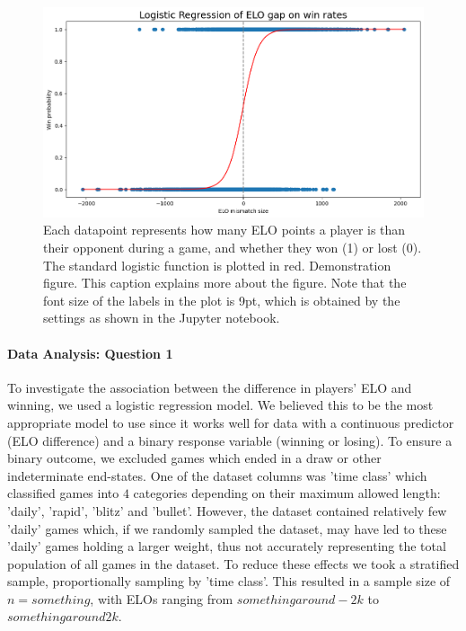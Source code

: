 \documentclass[10pt,a4paper,twocolumn]{article}
\begin{document}
\begin{figure}[t]
  \centering
  \includegraphics{report/images/log_regression.png}
  \caption{Each datapoint represents how many ELO points a player is than their opponent during a game, and whether they won (1) or lost (0). The standard logistic function is plotted in red.
  Demonstration figure. This caption explains more about the figure. Note that the font size of the labels in the plot is 9pt, which is obtained by the settings as shown in the Jupyter notebook.}
  \label{fds-project-template:fig:log_regression}
\end{figure}


\paragraph{Data Analysis: Question 1}
To investigate the association between the difference in players' ELO and winning, we used a logistic regression model. We believed this to be the most appropriate model to use since it works well for data with a continuous predictor (ELO difference) and a binary response variable (winning or losing). To ensure a binary outcome, we excluded games which ended in a draw or other indeterminate end-states.
One of the dataset columns was 'time class' which classified games into $4$ categories depending on their maximum allowed length: 'daily', 'rapid', 'blitz' and 'bullet'. However, the dataset contained relatively few 'daily' games which, if we randomly sampled the dataset, may have led to these 'daily' games holding a larger weight, thus not accurately representing the total population of all games in the dataset.
To reduce these effects we took a stratified sample, proportionally sampling by 'time class'. This resulted in a sample size of $n={something}$, with ELOs ranging from ${something around -2k}$ to ${something around 2k}$. \newline
\end{document}
